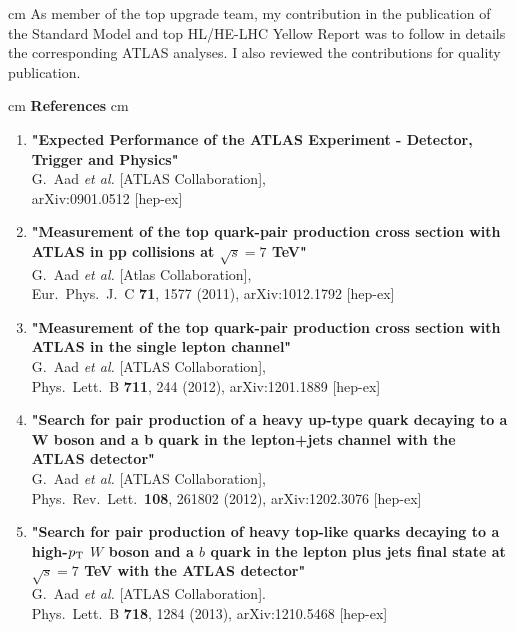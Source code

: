 \documentclass[12pt]{article}
\begin{document}
 cm
\noindent {\bf \color{red} [19]} As member of the top upgrade team, my contribution in the publication of the Standard Model and top HL/HE-LHC Yellow Report was to follow in details the corresponding ATLAS analyses. I also reviewed the contributions for quality publication.

 cm
{\bf \Large  References }
 cm

\begin{enumerate}
\item
 {\bf "Expected Performance of the ATLAS Experiment - Detector, Trigger and Physics"}
  \\{}G.~Aad {\it et al.}  [ATLAS Collaboration],
  \\{}arXiv:0901.0512 [hep-ex]

\item 
  {\bf "Measurement of the top quark-pair production cross section with ATLAS in pp collisions at $\sqrt{s}=7$ TeV"}
\\{}G.~Aad {\it et al.}  [Atlas Collaboration],
\\{}Eur.\ Phys.\ J.\ C {\bf 71}, 1577 (2011), arXiv:1012.1792 [hep-ex]

\item
  {\bf "Measurement of the top quark-pair production cross section with ATLAS in the single lepton channel"}
  \\{}G.~Aad {\it et al.}  [ATLAS Collaboration],
  \\{}Phys.\ Lett.\ B {\bf 711}, 244 (2012), arXiv:1201.1889 [hep-ex]

\item
 {\bf "Search for pair production of a heavy up-type quark decaying to a W boson and a b quark in the lepton+jets channel with the ATLAS detector"}
  \\{}G.~Aad {\it et al.}  [ATLAS Collaboration],
  \\{}Phys.\ Rev.\ Lett.\  {\bf 108}, 261802 (2012), arXiv:1202.3076 [hep-ex]

\item
  {\bf "Search for pair production of heavy top-like quarks decaying to a high-$p_{\rm T}$ $W$ boson and a $b$ quark in the lepton plus jets final state at $\sqrt{s}=7$ TeV with the ATLAS detector"}
  \\{}G.~Aad {\it et al.}  [ATLAS Collaboration].
\\{}Phys.\ Lett.\ B {\bf 718}, 1284 (2013), arXiv:1210.5468 [hep-ex]


\end{enumerate}
\end{document}
